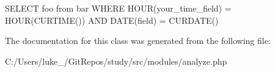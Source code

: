 S\+E\+L\+E\+CT foo from bar W\+H\+E\+RE H\+O\+U\+R(your\+\_\+time\+\_\+field) = H\+O\+U\+R(\+C\+U\+R\+T\+I\+M\+E()) A\+ND D\+A\+T\+E(field) = C\+U\+R\+D\+A\+T\+E() 

The documentation for this class was generated from the following file\+:\begin{DoxyCompactItemize}
\item 
C\+:/\+Users/luke\+\_\+/\+Git\+Repos/study/src/modules/analyze.\+php\end{DoxyCompactItemize}
